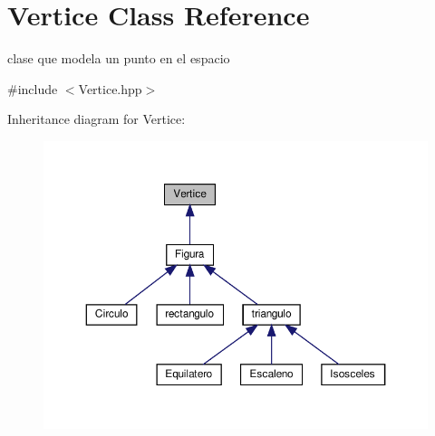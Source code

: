 \hypertarget{class_vertice}{}\section{Vertice Class Reference}
\label{class_vertice}


clase que modela un punto en el espacio  




{\ttfamily \#include $<$Vertice.\+hpp$>$}



Inheritance diagram for Vertice\+:
\nopagebreak
\begin{figure}[H]
\begin{center}
\leavevmode
\includegraphics[width=350pt]{class_vertice__inherit__graph}
\end{center}
\end{figure}
